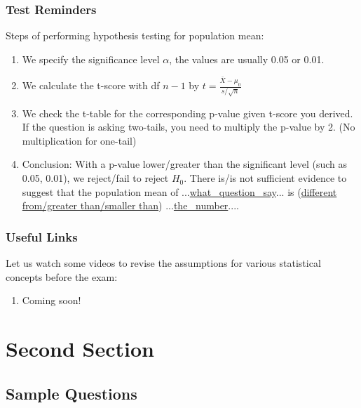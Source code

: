 \documentclass{beamer}
\begin{document}

\begin{frame}
\frametitle{Test Reminders}

Steps of performing hypothesis testing for population mean:

\begin{enumerate}
\item We specify the significance level $\alpha$, the values are usually 0.05 or 0.01.

\item We calculate the t-score with df $n-1$ by $t = \frac{\bar X - \mu_0}{s/\sqrt{n}}$

\item We check the t-table for the corresponding p-value given t-score you derived. If the question is asking two-tails, you need to multiply the p-value by 2. (No multiplication for one-tail)

\item Conclusion: With a p-value lower/greater than the significant level (such as 0.05, 0.01), we reject/fail to reject $H_0$. There is/is not sufficient evidence to suggest that the population mean of ...\underline{what \ question \ say}... is (\underline{different from/greater than/smaller than}) ...\underline{the \ number}....

\end{enumerate}
\end{frame}


\begin{frame}
\frametitle{Useful Links}

Let us watch some videos to revise the assumptions for various statistical concepts before the exam:

\begin{enumerate}


\item Coming soon!
\end{enumerate}
\end{frame}



\section{Second Section}
\subsection{Sample Questions}
\end{document}
